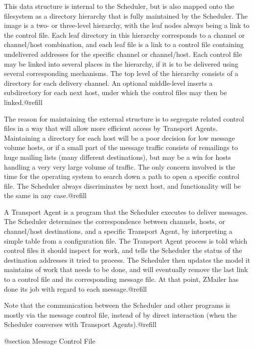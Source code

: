 {{This data structure is internal to the Scheduler, but is also mapped
onto the filesystem as a directory hierarchy that is fully maintained
by the Scheduler.  The image is a two- or three-level hierarchy, with
the leaf nodes always being a link to the control file.  Each leaf
directory in this hierarchy corresponds to a channel or channel/host
combination, and each leaf file is a link to a control file containing
undelivered addresses for the specific channel or channel/host.  Each
control file may be linked into several places in the hierarchy, if it
is to be delivered using several corresponding mechanisms. The top
level of the hierarchy consists of a directory for each delivery
channel. An optional middle-level inserts a subdirectory for each next
host, under which the control files may then be linked.@refill

The reason for maintaining the external structure is to segregate
related control files in a way that will allow more efficient access by
Transport Agents.  Maintaining a directory for each host will be a poor
decision for low message volume hosts, or if a small part of the
message traffic consists of remailings to huge mailing lists (many
different destinations), but may be a win for hosts handling a very
very large volume of traffic.  The only concern involved is the time for
the operating system to search down a path to open a specific control
file. The Scheduler always discriminates by next host, and
functionality will be the same in any case.@refill

A Transport Agent is a program that the Scheduler executes to deliver
messages.  The Scheduler determines the correspondence between channels,
hosts, or channel/host destinations, and a specific Transport Agent, by
interpreting a simple table from a configuration file.  The Transport
Agent process is told which control files it should inspect for work, and
tells the Scheduler the status of the destination addresses it tried to
process.  The Scheduler then updates the model it maintains of work that
needs to be done, and will eventually remove the last link to a control file
and its corresponding message file.  At that point, ZMailer has done its job
with regard to each message.@refill

Note that the communication between the Scheduler and other programs is
mostly via the message control file, instead of by direct interaction
(when the Scheduler converses with Transport Agents).@refill

@section Message Control File

}}
